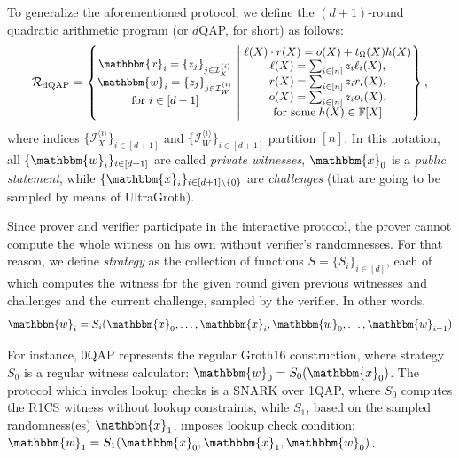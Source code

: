 To generalize the aforementioned protocol, we define the $(d+1)$-round quadratic arithmetic program (or $d$QAP, for short) as follows:
\[
\small\mathcal{R}_{\text{dQAP}} = \left\{ 
    \begin{matrix} 
        \mathbbm{x}_i = \{z_j\}_{j \in \mathcal{I}_{X}^{\langle i \rangle}} \\
        \mathbbm{w}_i = \{z_j\}_{j \in \mathcal{I}_{W}^{\langle i \rangle}} \\
        \text{for }i \in [d+1]
    \end{matrix}
    \; \middle| \; 
    \begin{matrix}
        \ell(X) \cdot r(X) = o(X) + t_{\Omega}(X)h(X) \\
        \ell(X) = \sum_{i \in [n]}z_i\ell_i(X), \\
        r(X) = \sum_{i \in [n]}z_ir_i(X), \\
        o(X) = \sum_{i \in [n]}z_io_i(X), \\
        \text{for some} \; h(X) \in \mathbb{F}[X]
    \end{matrix}
\right\},
\]
where indices $\{\mathcal{I}_X^{\langle i \rangle}\}_{i \in [d+1]}$ and $\{\mathcal{I}_W^{\langle i \rangle}\}_{i \in [d+1]}$ partition $[n]$. In this notation, all $\{\mathbbm{w}_i\}_{i \in [d+1]}$ are called \textit{private witnesses}, $\mathbbm{x}_0$ is a \textit{public statement}, while $\{\mathbbm{x}_i\}_{i \in [d+1]\setminus \{0\}}$ are \textit{challenges} (that are going to be sampled by means of UltraGroth).

Since prover and verifier participate in the interactive protocol, the prover cannot compute the whole witness on his own without verifier's randomnesses. For that reason, we define \textit{strategy} as the collection of functions $S=\{S_i\}_{i \in [d]}$, each of which computes the witness for the given round given previous witnesses and challenges and the current challenge, sampled by the verifier. In other words,
\[
\mathbbm{w}_i = S_i(\mathbbm{x}_0,\dots,\mathbbm{x}_i,\mathbbm{w}_0,\dots,\mathbbm{w}_{i-1})
\]

\begin{example}
For instance, 0QAP represents the regular Groth16 construction, where strategy
$S_0$ is a regular witness calculator: $\mathbbm{w}_0=S_0(\mathbbm{x}_0)$. The
protocol which involes lookup checks is a SNARK over 1QAP, where $S_0$ computes
the R1CS witness without lookup constraints, while $S_1$, based on the sampled
randomness(es) $\mathbbm{x}_1$, imposes lookup check condition:
$\mathbbm{w}_1=S_1(\mathbbm{x}_0,\mathbbm{x}_1,\mathbbm{w}_0)$.
\end{example}

